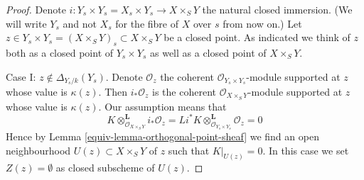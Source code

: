 \begin{proof}

Denote $i : Y_s \times Y_s = X_s \times Y_s \to X \times_S Y$
the natural closed immersion. (We will write $Y_s$ and not $X_s$
for the fibre of $X$ over $s$ from now on.) Let
$z \in Y_s \times Y_s = (X \times_S Y)_s \subset X \times_S Y$
be a closed point. As indicated we think of $z$ both as a closed point
of $Y_s \times Y_s$ as well as a closed point of $X \times_S Y$.

\medskip\noindent
Case I: $z \not \in \Delta_{Y_s/k}(Y_s)$. Denote $\mathcal{O}_z$
the coherent $\mathcal{O}_{Y_s \times Y_s}$-module supported at $z$
whose value is $\kappa(z)$. Then $i_*\mathcal{O}_z$ is the
coherent $\mathcal{O}_{X \times_S Y}$-module supported at $z$
whose value is $\kappa(z)$. Our assumption means that
$$
K \otimes_{\mathcal{O}_{X \times_S Y}}^\mathbf{L} i_*\mathcal{O}_z =
Li^*K \otimes_{\mathcal{O}_{Y_s \times Y_s}}^\mathbf{L} \mathcal{O}_z = 0
$$
Hence by Lemma \ref{equiv-lemma-orthogonal-point-sheaf}
we find an open neighbourhood $U(z) \subset X \times_S Y$ of $z$
such that $K|_{U(z)} = 0$. In this case we set $Z(z) = \emptyset$
as closed subscheme of $U(z)$.


\end{proof}
